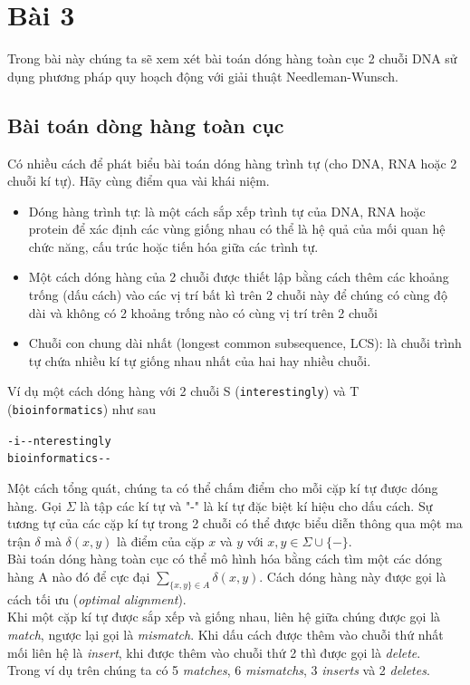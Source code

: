 \section{Bài 3}
Trong bài này chúng ta sẽ xem xét bài toán dóng hàng
toàn cục 2 chuỗi DNA sử dụng phương pháp quy hoạch động 
với giải thuật Needleman-Wunsch.

\subsection{Bài toán dòng hàng toàn cục}
Có nhiều cách để phát biểu bài toán dóng hàng trình tự 
(cho DNA, RNA hoặc 2 chuỗi kí tự). Hãy cùng điểm qua vài khái niệm.

\begin{itemize}
    \item Dóng hàng trình tự: là một cách sắp xếp trình tự của DNA,
    RNA hoặc protein để xác định các vùng giống nhau có thể là
    hệ quả của mối quan hệ chức năng, cấu trúc hoặc tiến hóa giữa
    các trình tự.
    \item Một cách dóng hàng của 2 chuỗi được thiết lập bằng cách thêm
    các khoảng trống (dấu cách) vào các vị trí bất kì trên 2 chuỗi này
    để chúng có cùng độ dài và không có 2 khoảng trống nào có cùng vị trí 
    trên 2 chuỗi
    \item Chuỗi con chung dài nhất (longest common subsequence, LCS):
    là chuỗi trình tự chứa nhiều kí tự giống nhau nhất của hai hay
    nhiều chuỗi.
\end{itemize}
Ví dụ một cách dóng hàng với 2 chuỗi S (\lstinline{interestingly}) 
và T (\lstinline{bioinformatics}) như sau
\begin{center}
    \lstinline{-i--nterestingly} \\
    \lstinline{bioinformatics--}
\end{center}

Một cách tổng quát, chúng ta có thể chấm điểm cho mỗi cặp kí tự được dóng hàng.
Gọi $\Sigma$ là tập các kí tự và "-" là kí tự đặc biệt kí hiệu cho dấu cách. 
Sự tương tự của các cặp kí tự trong 2 chuỗi có thể được biểu diễn thông qua 
một ma trận $\delta$ mà $\delta(x,y)$ là điểm của cặp $x$ và $y$ với 
$x, y \in \Sigma \cup \{-\}$. \\
Bài toán dóng hàng toàn cục có thể mô hình hóa bằng cách tìm một các dóng hàng A
nào đó để cực đại $\sum_{\{x, y \} \in A} \delta(x,y)$. Cách dóng hàng này được
gọi là cách tối ưu (\textit{optimal alignment}). \\
Khi một cặp kí tự được sắp xếp và giống nhau, liên hệ giữa chúng
 được gọi là \textit{match}, ngược
lại gọi là \textit{mismatch}. Khi dấu cách được thêm vào chuỗi thứ nhất mối liên hệ 
là \textit{insert}, khi được thêm vào chuỗi thứ 2 thì được gọi là \textit{delete}. \\
Trong ví dụ trên chúng ta có 5 \textit{matches}, 6 \textit{mismatchs}, 3 \textit{inserts}
và 2 \textit{deletes}.

